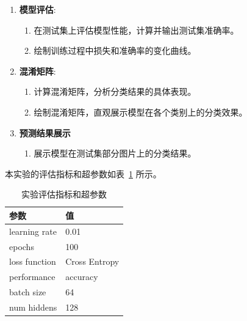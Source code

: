 \documentclass[12pt]{article}
\begin{document}
\begin{enumerate}
  \item \textbf{模型评估}:
        \begin{enumerate}
          \item 在测试集上评估模型性能，计算并输出测试集准确率。
          \item 绘制训练过程中损失和准确率的变化曲线。
        \end{enumerate}

  \item \textbf{混淆矩阵}:
        \begin{enumerate}
          \item 计算混淆矩阵，分析分类结果的具体表现。
          \item 绘制混淆矩阵，直观展示模型在各个类别上的分类效果。
        \end{enumerate}
  \item \textbf{预测结果展示}
        \begin{enumerate}
          \item 展示模型在测试集部分图片上的分类结果。
        \end{enumerate}
\end{enumerate}
本实验的评估指标和超参数如表~\ref{tab:training-params} 所示。
\begin{table}[htbp]
  \centering
  \caption{实验评估指标和超参数}
  \label{tab:training-params}
  \begin{tabular}{m{3cm}<{\centering}m{3cm}<{\centering}}
    \toprule
    \textbf{参数}   & \textbf{值}    \\[\medskipamount]
    \midrule
    learning rate & 0.01          \\[\medskipamount]
    epochs        & 100           \\[\medskipamount]
    loss function & Cross Entropy \\[\medskipamount]
    performance   & accuracy      \\[\medskipamount]
    batch size    & 64            \\[\medskipamount]
    num hiddens   & 128           \\[\medskipamount]
    \bottomrule
  \end{tabular}
\end{table}
\end{document}
